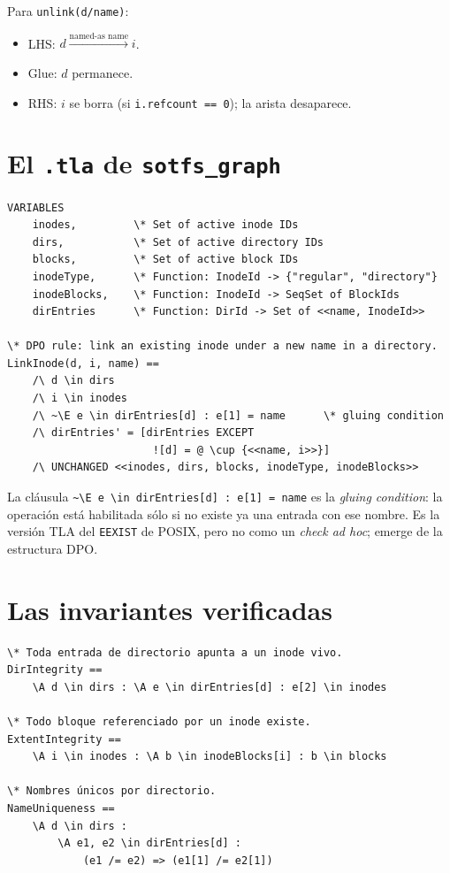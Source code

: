 Para \texttt{unlink(d/name)}:

\begin{itemize}
  \item LHS: $d \xrightarrow{\text{named-as name}} i$.
  \item Glue: $d$ permanece.
  \item RHS: $i$ se borra (si \texttt{i.refcount == 0}); la arista desaparece.
\end{itemize}

\section{El \texttt{.tla} de \texttt{sotfs\_graph}}

\begin{lstlisting}[language=tla, frame=single, basicstyle=\ttfamily\scriptsize]
VARIABLES
    inodes,         \* Set of active inode IDs
    dirs,           \* Set of active directory IDs
    blocks,         \* Set of active block IDs
    inodeType,      \* Function: InodeId -> {"regular", "directory"}
    inodeBlocks,    \* Function: InodeId -> SeqSet of BlockIds
    dirEntries      \* Function: DirId -> Set of <<name, InodeId>>

\* DPO rule: link an existing inode under a new name in a directory.
LinkInode(d, i, name) ==
    /\ d \in dirs
    /\ i \in inodes
    /\ ~\E e \in dirEntries[d] : e[1] = name      \* gluing condition
    /\ dirEntries' = [dirEntries EXCEPT
                       ![d] = @ \cup {<<name, i>>}]
    /\ UNCHANGED <<inodes, dirs, blocks, inodeType, inodeBlocks>>
\end{lstlisting}

La cláusula \texttt{\textasciitilde\textbackslash E e \textbackslash in
dirEntries[d] : e[1] = name} es la \emph{gluing condition}: la
operación está habilitada sólo si no existe ya una entrada con
ese nombre. Es la versión TLA del \texttt{EEXIST} de POSIX, pero
no como un \emph{check ad hoc}; emerge de la estructura DPO.

\section{Las invariantes verificadas}

\begin{lstlisting}[language=tla, frame=single, basicstyle=\ttfamily\scriptsize]
\* Toda entrada de directorio apunta a un inode vivo.
DirIntegrity ==
    \A d \in dirs : \A e \in dirEntries[d] : e[2] \in inodes

\* Todo bloque referenciado por un inode existe.
ExtentIntegrity ==
    \A i \in inodes : \A b \in inodeBlocks[i] : b \in blocks

\* Nombres únicos por directorio.
NameUniqueness ==
    \A d \in dirs :
        \A e1, e2 \in dirEntries[d] :
            (e1 /= e2) => (e1[1] /= e2[1])
\end{lstlisting}

